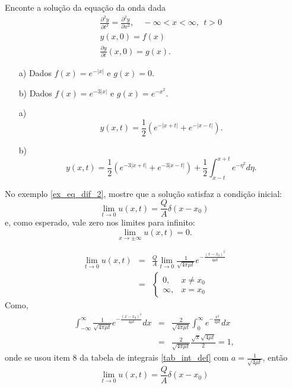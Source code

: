 \begin{Exercise} Enconte a solução da equação da onda dada
\begin{eqnarray*}
&&\frac{\partial^2 y}{\partial t^2}=\frac{\partial^2
y}{\partial x^2},\quad -\infty<x<\infty,\ \ t>0\\
&&y(x,0)=f(x)\\
&&\frac{\partial y}{\partial t}(x,0)=g(x).
\end{eqnarray*}
\begin{itemize}
 \item[a)] Dados $f(x)=e^{-|x|}$ e $g(x)=0$.
  \item[b)] Dados $f(x)=e^{-3|x|}$ e $g(x)=e^{-x^2}$.
\end{itemize}
\end{Exercise}
\begin{Answer}
\begin{itemize}
 \item [a)] 
 \begin{equation*}
y(x,t)=\frac{1}{2} \left( e^{-|x+t|}+e^{-|x-t|}
\right).
\end{equation*}
\item [b)]
 \begin{equation*}
y(x,t)=\frac{1}{2} \left(  e^{-3|x+t|}+e^{-3|x-t|}
\right)+\frac{1}{2}\int_{x-t}^{x+t}e^{-\eta^2}d\eta.
\end{equation*}
\end{itemize}
\end{Answer}
\begin{Exercise}No exemplo \ref{ex_eq_dif_2}, mostre que a solução satisfaz a condição inicial: 
\begin{equation}
\lim_{t\to 0}u(x,t)=\frac{Q}{A}\delta(x-x_0)
\end{equation}
e, como esperado, vale zero nos limites para infinito:
\begin{equation}
\lim_{x\to\pm\infty}u(x,t)=0.
\end{equation}
\end{Exercise}
\begin{Answer}
\begin{eqnarray*}
\lim_{t\to 0} u(x,t)&=&\frac{Q}{A}\lim_{t\to 0} \frac{1}{\sqrt{4\pi \mu t}}e^{-\frac{(x-x_0)^2}{4\mu t}}\\
&=&\left\{\begin{array}{ll}0,&x\neq x_0\\ \infty, &x=x_0\end{array}\right.
\end{eqnarray*}
Como,
\begin{eqnarray*}
\int_{-\infty}^\infty\frac{1}{\sqrt{4\pi \mu t}}e^{-\frac{(x-x_0)^2}{4\mu t}}dx&=&\frac{2}{\sqrt{4\pi \mu t}}\int_{0}^\infty e^{-\frac{x^2}{4\mu t}}dx\\
&=&\frac{2}{\sqrt{4\pi \mu t}}\frac{\sqrt{\pi} \sqrt{4\mu t}}{2}=1,
\end{eqnarray*}
onde se usou item 8 da tabela de integrais \ref{tab_int_def} com $a=\frac{1}{\sqrt{4\mu t}}$, então
\begin{equation}
\lim_{t\to 0} u(x,t)=\frac{Q}{A} \delta(x-x_0)
\end{equation}
\end{Answer}
